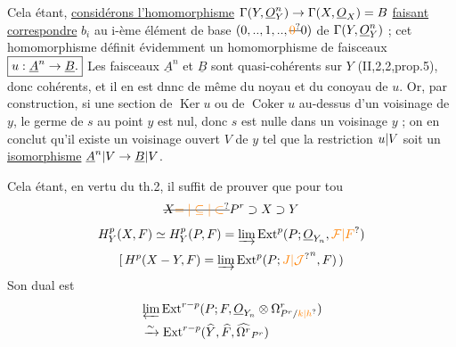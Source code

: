 Cela étant, \uline{considérons l'homomorphisme} $\Gamma(Y,\underline O_Y^n)\to\Gamma(X,\underline O_X)=B$ \uline{faisant correspondre}
$b_i$ au i-ème élément de base $(0,..,1,..,\deleted{\unsure{0}}0)$ de $\Gamma(Y,\underline O_Y^n)$ ; cet homomorphisme définit évidemment un homomorphisme de faisceaux $\boxed{u:\underline A^n\to\underline B.}$  Les faisceaux $\underline A^n$ et $\underline B$ sont quasi-cohérents sur $Y$ (II,2,2,prop.5), donc cohérents, et il en est dnnc de même du noyau et du conoyau de $u$. Or, par construction, si  une section de $\operatorname{Ker}u$ ou de $\operatorname{Coker}u$ au-dessus d'un voisinage de $y$, le germe de $s$ au point $y$ est nul, donc $s$ est nulle dans un voisinage  $y$ ; on en conclut qu'il existe un voisinage ouvert $V$ de $y$ tel que la restriction $u\vert V$ soit un \uline{isomorphisme} $\underline A^n\vert V\to\underline B\vert V$.

Cela étant, en vertu du th.2, il suffit de prouver que pour tou
\[
\deleted{X\unsure{=|\subseteq|\subset}}P^r\supset X\supset Y
\]
\[
H^p_Y(X,F)\simeq H^p_Y(P,F)=\varinjlim\operatorname{Ext}^p(P;\underline O_{Y_n},\unsure{\mathcal F|F})
\]
\[
[\,H^p(X-Y,F)=\varinjlim\operatorname{Ext}^p(P;{\unsure{J|\mathcal J}}^n,F)\,)
\]
Son dual est
\[
\begin{aligned}
&\varprojlim\operatorname{Ext}^{r-p}(P;F,\underline O_{Y_n}\otimes\Omega^r_{P^r/\unsure{k|h}})\\
&\xrightarrow{\sim}\operatorname{Ext}^{r-p}(\widehat Y,\widehat F,\widehat{\Omega^r}_{P^r})
\end{aligned}
\]

